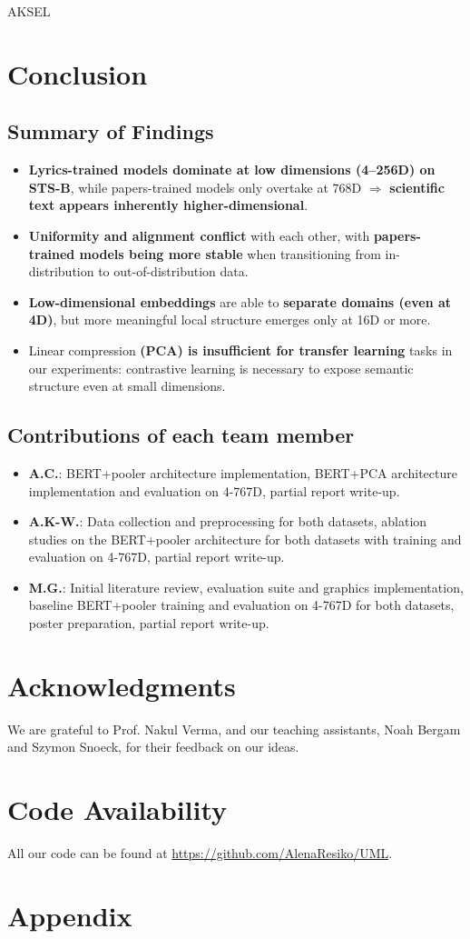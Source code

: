 \documentclass{article}
\begin{document}
AKSEL

\section{Conclusion}

\subsection{Summary of Findings}
\begin{itemize}
\item \textbf{Lyrics-trained models dominate at low dimensions (4–256D) on STS-B}, while
papers-trained models only overtake at 768D $\Rightarrow$ \textbf{scientific text appears
inherently higher-dimensional}.
\item \textbf{Uniformity and alignment conflict} with each other, with
\textbf{papers-trained models being more stable} when transitioning from in-distribution
to out-of-distribution data.
\item \textbf{Low-dimensional embeddings} are able to \textbf{separate domains (even at
4D)}, but more meaningful local structure emerges only at 16D or more.
\item Linear compression \textbf{(PCA) is insufficient for transfer learning} tasks in
our experiments: contrastive learning is necessary to expose semantic structure even at
small dimensions.
\end{itemize}

\subsection{Contributions of each team member}
\begin{itemize}
\item \textbf{A.C.}: BERT+pooler architecture implementation, BERT+PCA architecture
implementation and evaluation on 4-767D, partial report write-up.
\item \textbf{A.K-W.}: Data collection and preprocessing for both datasets, ablation
studies on the BERT+pooler architecture for both datasets with training and evaluation on
4-767D, partial report write-up.
\item \textbf{M.G.}: Initial literature review, evaluation suite and graphics
implementation, baseline BERT+pooler training and evaluation on 4-767D for both datasets,
poster preparation, partial report write-up.
\end{itemize}

\section*{Acknowledgments}
We are grateful to Prof. Nakul Verma, and our teaching assistants, Noah Bergam and Szymon
Snoeck, for their feedback on our ideas.

\section*{Code Availability}
All our code can be found at \hyperlink{Github}{https://github.com/AlenaResiko/UML}.




\raggedbottom

\section*{Appendix}

\raggedbottom
\end{document}
